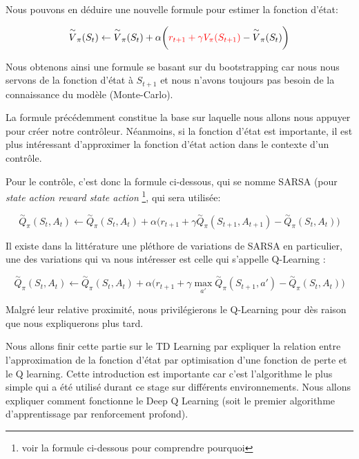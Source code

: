 Nous pouvons en déduire une nouvelle formule pour estimer la fonction d'état:
 
\begin{equation}
\overset{\sim}{V}_{\pi}(S_t) \leftarrow \overset{\sim}{V}_{\pi}(S_t) + \alpha \bigg(\textcolor{red}{r_{t+1} + \gamma V_{\pi}(S_{t+1})} - \overset{\sim}{V}_{\pi}(S_t)\bigg)
\end{equation}

Nous obtenons ainsi une formule se basant sur du bootstrapping car nous nous servons de la fonction d'état à $S_{t+1}$ et nous n'avons toujours pas besoin de la connaissance du modèle (Monte-Carlo).

La formule précédemment constitue la base sur laquelle nous allons nous appuyer pour créer notre contrôleur. Néanmoins, si la fonction d'état est importante, il est plus intéressant d'approximer la fonction d'état action dans le contexte d'un contrôle.

Pour le contrôle, c'est donc la formule ci-dessous, qui se nomme SARSA (pour \emph{state action reward state action} \footnote{voir la formule ci-dessous pour comprendre pourquoi}, qui sera utilisée:

\begin{equation}
\overset{\sim}{Q}_{\pi}(S_t, A_t) \leftarrow \overset{\sim}{Q}_{\pi}(S_t, A_t) + \alpha \bigg(r_{t+1} + \gamma \overset{\sim}{Q}_{\pi}(S_{t+1}, A_{t+1}) - \overset{\sim}{Q}_{\pi}(S_t, A_t)\bigg)
\end{equation}

Il existe dans la littérature une pléthore de variations de SARSA en particulier, une des variations qui va nous intéresser est celle qui s'appelle Q-Learning \cite{Watkins92q-learning}: 

\begin{equation}
\overset{\sim}{Q}_{\pi}(S_t, A_t) \leftarrow \overset{\sim}{Q}_{\pi}(S_t, A_t) + \alpha \bigg(r_{t+1} + \gamma \underset{a'}{\max}\overset{\sim}{Q}_{\pi}(S_{t+1}, a') - \overset{\sim}{Q}_{\pi}(S_t, A_t)\bigg)
\end{equation}

Malgré leur relative proximité, nous privilégierons le Q-Learning pour dès raison que nous expliquerons plus tard. 

Nous allons finir cette partie sur le TD Learning par expliquer la relation entre l'approximation de la fonction d'état par optimisation d'une fonction de perte et le Q learning. Cette introduction est importante car c'est l'algorithme le plus simple qui a été utilisé durant ce stage sur différents environnements. Nous allons expliquer comment fonctionne le Deep Q Learning \cite{2013arXiv1312.5602M} \cite{mnih-dqn-2015} (soit le premier algorithme d'apprentissage par renforcement profond). 

